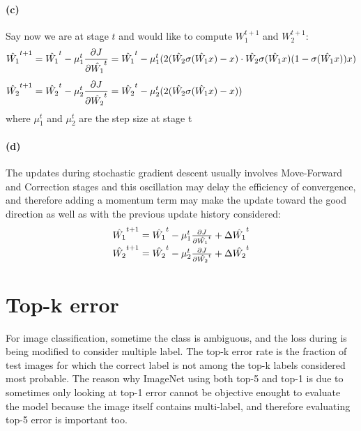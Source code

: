 \documentclass{article}
\begin{document}
\paragraph{(c)} Say now we are at stage $t$ and would like to compute $W_1^{t+1}$ and $W_2^{t+1}$:
\begin{equation}
\begin{align}
\hat{W_1}^{t+1} &= \hat{W_1}^t - \mu_1^t {\partial J \over \partial \hat{W_1}^t} = \hat{W_1}^t - \mu_1^t( 2(\hat{W_2}\sigma(\hat{W_1}x)-x) \cdot \hat{W_2}\sigma(\hat{W_1}x)(1-\sigma(\hat{W_1}x))x ) \\[0.4em]
\hat{W_2}^{t+1} &= \hat{W_2}^t - \mu_2^t {\partial J \over \partial \hat{W_2}^t} = \hat{W_2}^t - \mu_2^t( 2(\hat{W_2}\sigma(\hat{W_1}x)-x) )
\end{align}
\end{equation}
where $\mu_1^t$ and $\mu_2^t$ are the step size at stage t

\paragraph{(d)} The updates during stochastic gradient descent usually involves Move-Forward and Correction stages and this oscillation may delay the efficiency of convergence, and therefore adding a momentum term may make the update toward the good direction as well as with the previous update history considered:
\begin{equation}
\begin{matrix}
\hat{W_1}^{t+1} = \hat{W_1}^t - \mu_1^t {\partial J \over \partial \hat{W_1}^t} + \Delta \hat{W_1}^t \\[0.4em]
\hat{W_2}^{t+1} = \hat{W_2}^t - \mu_2^t {\partial J \over \partial \hat{W_2}^t} + \Delta \hat{W_2}^t
\end{matrix}
\end{equation}

\section{Top-k error}
For image classification, sometime the class is ambiguous, and the loss during is being modified to consider multiple label. The top-k error rate is the fraction of test images for which the correct label is not among the top-k labels considered most probable. The reason why ImageNet using both top-5 and top-1 is due to sometimes only looking at top-1 error cannot be objective enought to evaluate the model because the image itself contains multi-label, and therefore evaluating top-5 error is important too.
\end{document}

